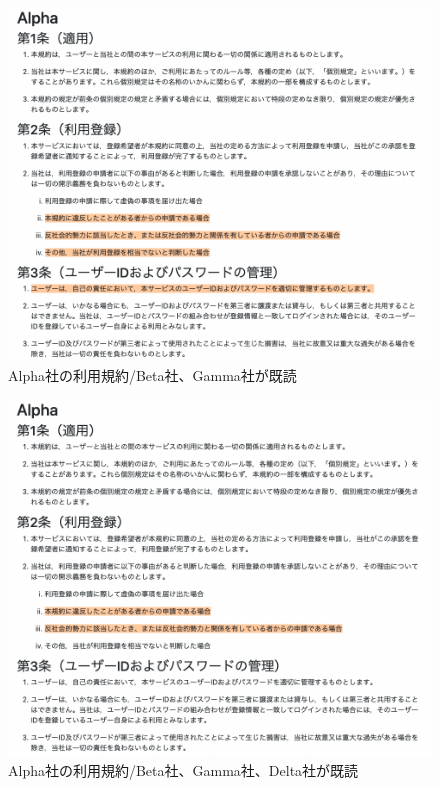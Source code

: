 \begin{figure}[h]
  \begin{center}
      \includegraphics[width=16cm]{img/alpha_bg.png}
      \caption{Alpha社の利用規約/Beta社、Gamma社が既読}
      \label{img:Alpha社の利用規約/Beta社、Gamma社が既読}
  \end{center}
\end{figure}
\begin{figure}[h]
  \begin{center}
      \includegraphics[width=16cm]{img/alpha_bgd.png}
      \caption{Alpha社の利用規約/Beta社、Gamma社、Delta社が既読}
      \label{img:Alpha社の利用規約/Beta社、Gamma社、Delta社が既読}
  \end{center}
\end{figure}

